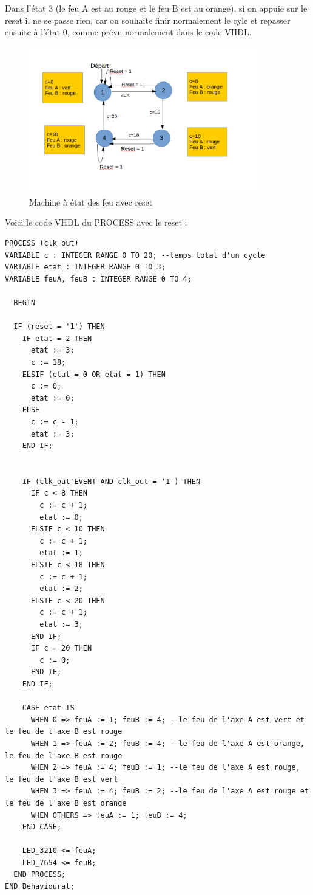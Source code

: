 \documentclass[11pt]{report}
\begin{document}
Dans l'état 3 (le feu A est au rouge et le feu B est au orange), si on appuie sur le reset il ne se passe rien, car on souhaite finir normalement le cyle et repasser ensuite à l'état 0, comme prévu normalement dans le code VHDL.

\begin{figure}[h]
\includegraphics[width=10cm]{TP03-2.png}
\caption{Machine à état des feu avec reset}
\end{figure}
\newpage

Voici le code VHDL du PROCESS avec le reset :
\begin{lstlisting}
PROCESS (clk_out)
VARIABLE c : INTEGER RANGE 0 TO 20; --temps total d'un cycle
VARIABLE etat : INTEGER RANGE 0 TO 3;
VARIABLE feuA, feuB : INTEGER RANGE 0 TO 4;

  BEGIN

  IF (reset = '1') THEN
    IF etat = 2 THEN
      etat := 3;
      c := 18;
    ELSIF (etat = 0 OR etat = 1) THEN
      c := 0;
      etat := 0;
    ELSE
      c := c - 1;
      etat := 3;
    END IF;


    IF (clk_out'EVENT AND clk_out = '1') THEN
      IF c < 8 THEN
        c := c + 1;
        etat := 0;
      ELSIF c < 10 THEN
        c := c + 1;
        etat := 1;
      ELSIF c < 18 THEN
        c := c + 1;
        etat := 2;
      ELSIF c < 20 THEN
        c := c + 1;
        etat := 3;
      END IF;
      IF c = 20 THEN
        c := 0;
      END IF;
    END IF;

    CASE etat IS
      WHEN 0 => feuA := 1; feuB := 4; --le feu de l'axe A est vert et le feu de l'axe B est rouge
      WHEN 1 => feuA := 2; feuB := 4; --le feu de l'axe A est orange, le feu de l'axe B est rouge
      WHEN 2 => feuA := 4; feuB := 1; --le feu de l'axe A est rouge, le feu de l'axe B est vert
      WHEN 3 => feuA := 4; feuB := 2; --le feu de l'axe A est rouge et le feu de l'axe B est orange
      WHEN OTHERS => feuA := 1; feuB := 4;
    END CASE;

    LED_3210 <= feuA;
    LED_7654 <= feuB;
  END PROCESS;
END Behavioural;


\end{lstlisting}
\end{document}
